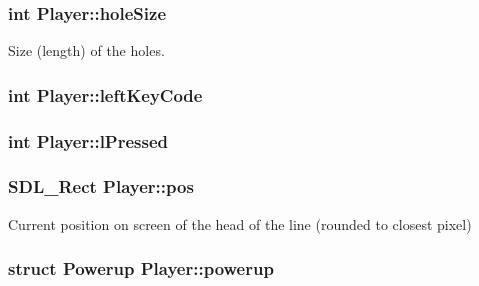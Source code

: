 \hypertarget{classPlayer_a9ba2271607df07a07d2454a32fe39f78}{}
\subsubsection[{hole\+Size}]{\setlength{\rightskip}{0pt plus 5cm}int Player\+::hole\+Size\hspace{0.3cm}{\ttfamily [private]}}\label{classPlayer_a9ba2271607df07a07d2454a32fe39f78}


Size (length) of the holes. 

\hypertarget{classPlayer_a865b251c8ca4efb1aade99949f08aa3e}{}
\subsubsection[{left\+Key\+Code}]{\setlength{\rightskip}{0pt plus 5cm}int Player\+::left\+Key\+Code\hspace{0.3cm}{\ttfamily [private]}}\label{classPlayer_a865b251c8ca4efb1aade99949f08aa3e}
\hypertarget{classPlayer_a1af72ec313e22fa17c7298b7ddde46ab}{}
\subsubsection[{l\+Pressed}]{\setlength{\rightskip}{0pt plus 5cm}int Player\+::l\+Pressed\hspace{0.3cm}{\ttfamily [private]}}\label{classPlayer_a1af72ec313e22fa17c7298b7ddde46ab}
\hypertarget{classPlayer_a8f4ab33d4123e6268970d9482f93a335}{}
\subsubsection[{pos}]{\setlength{\rightskip}{0pt plus 5cm}S\+D\+L\+\_\+\+Rect Player\+::pos\hspace{0.3cm}{\ttfamily [private]}}\label{classPlayer_a8f4ab33d4123e6268970d9482f93a335}


Current position on screen of the head of the line (rounded to closest pixel) 

\hypertarget{classPlayer_ac935cf0ac990dabc5d2bb344c3e9685d}{}
\subsubsection[{powerup}]{\setlength{\rightskip}{0pt plus 5cm}struct {\bf Powerup} Player\+::powerup\hspace{0.3cm}{\ttfamily [private]}}\label{classPlayer_ac935cf0ac990dabc5d2bb344c3e9685d}


